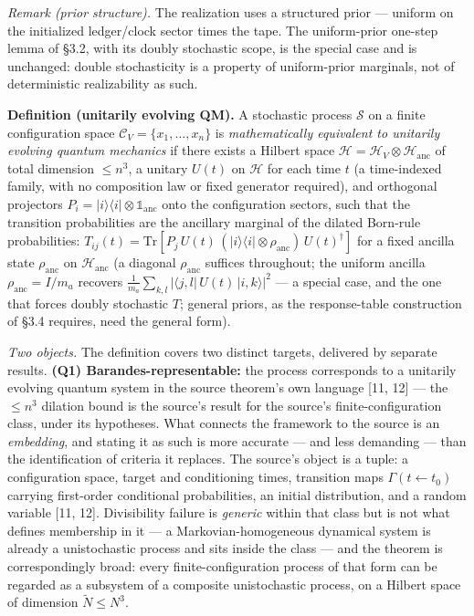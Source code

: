 \documentclass[
]{article}
\begin{document}
\emph{Remark (prior structure).} The realization uses a structured prior
--- uniform on the initialized ledger/clock sector times the tape. The
uniform-prior one-step lemma of §3.2, with its doubly stochastic scope,
is the special case and is unchanged: double stochasticity is a property
of uniform-prior marginals, not of deterministic realizability as such.

\textbf{Definition (unitarily evolving QM).} A stochastic process
\(\mathcal{S}\) on a finite configuration space
\(\mathcal{C}_V = \{x_1, \ldots, x_n\}\) is \emph{mathematically
equivalent to unitarily evolving quantum mechanics} if there exists a
Hilbert space
\(\mathcal{H} = \mathcal{H}_V \otimes \mathcal{H}_{\text{anc}}\) of
total dimension \(\leq n^3\), a unitary \(U(t)\) on \(\mathcal{H}\) for
each time \(t\) (a time-indexed family, with no composition law or fixed
generator required), and orthogonal projectors
\(P_i = |i\rangle\langle i| \otimes \mathbb{1}_{\text{anc}}\) onto the
configuration sectors, such that the transition probabilities are the
ancillary marginal of the dilated Born-rule probabilities:
\(T_{ij}(t) = \mathrm{Tr}\!\left[P_j\, U(t)\, (|i\rangle\langle i| \otimes \rho_{\text{anc}})\, U(t)^\dagger\right]\)
for a fixed ancilla state \(\rho_{\text{anc}}\) on
\(\mathcal{H}_{\text{anc}}\) (a diagonal \(\rho_{\text{anc}}\) suffices
throughout; the uniform ancilla \(\rho_{\text{anc}} = I/m_a\) recovers
\(\tfrac{1}{m_a}\sum_{k,l} |\langle j,l|\,U(t)\,|i,k\rangle|^2\) --- a
special case, and the one that forces doubly stochastic \(T\); general
priors, as the response-table construction of §3.4 requires, need the
general form).

\emph{Two objects.} The definition covers two distinct targets,
delivered by separate results. \textbf{(Q1) Barandes-representable:} the
process corresponds to a unitarily evolving quantum system in the source
theorem's own language {[}11, 12{]} --- the \(\leq n^3\) dilation bound
is the source's result for the source's finite-configuration class,
under its hypotheses. What connects the framework to the source is an
\emph{embedding}, and stating it as such is more accurate --- and less
demanding --- than the identification of criteria it replaces. The
source's object is a tuple: a configuration space, target and
conditioning times, transition maps \(\Gamma(t \leftarrow t_0)\)
carrying first-order conditional probabilities, an initial distribution,
and a random variable {[}11, 12{]}. Divisibility failure is
\emph{generic} within that class but is not what defines membership in
it --- a Markovian-homogeneous dynamical system is already a
unistochastic process and sits inside the class --- and the theorem is
correspondingly broad: every finite-configuration process of that form
can be regarded as a subsystem of a composite unistochastic process, on
a Hilbert space of dimension \(\tilde{N} \leq N^3\).
\end{document}
